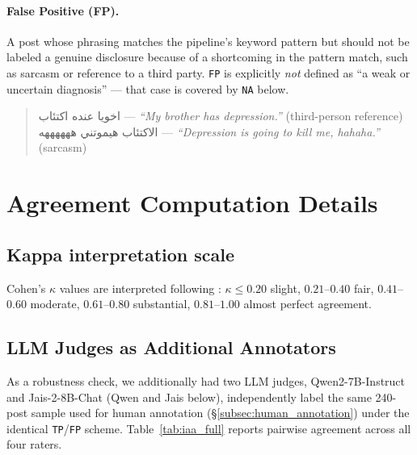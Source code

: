 \documentclass[11pt]{article}
\begin{document}
\paragraph{False Positive (FP).} A post whose phrasing matches the
pipeline's keyword pattern but should not be labeled a genuine
disclosure because of a shortcoming in the pattern match, such as
sarcasm or reference to a third party. \texttt{FP} is explicitly
\textit{not} defined as ``a weak or uncertain diagnosis'' --- that case
is covered by \texttt{NA} below.

\begin{quote}
\foreignlanguage{arabic}{اخويا عنده اكتئاب} --- \textit{``My brother has depression.''} (third-person reference)\\
\foreignlanguage{arabic}{الاكتئاب هيموتني ههههههه} --- \textit{``Depression is going to kill me, hahaha.''} (sarcasm)
\end{quote}

\section{Agreement Computation Details}
\label{app:agreement_details}

\subsection*{Kappa interpretation scale}

Cohen's $\kappa$ values are interpreted following
\citet{landis1977measurement}: $\kappa \leq 0.20$ slight,
$0.21$--$0.40$ fair, $0.41$--$0.60$ moderate, $0.61$--$0.80$
substantial, $0.81$--$1.00$ almost perfect agreement.

\subsection*{LLM Judges as Additional Annotators}
\label{app:llm_fp_estimate}

As a robustness check, we additionally had two LLM judges, Qwen2-7B-Instruct \citep{yang-etal-2024-qwen2} and Jais-2-8B-Chat \citep{anwar-etal-2025-jais2} (Qwen and Jais below), independently label the same 240-post sample used for human
annotation (\S\ref{subsec:human_annotation}) under the identical
\texttt{TP}/\texttt{FP} scheme. Table~\ref{tab:iaa_full} reports
pairwise agreement across all four raters.
\end{document}
